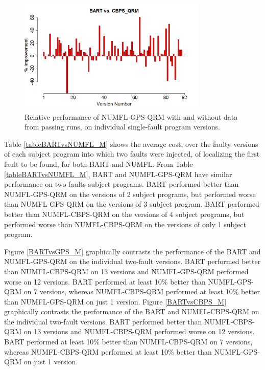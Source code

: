 \begin{figure}[!thpb]
\centering
\includegraphics[width=0.8\textwidth]{chapter4_BARTvsCBPS.pdf}
\caption{Relative performance of NUMFL-GPS-QRM with and without data from passing runs, on individual single-fault program versions.}
\label{BARTvsCBPS}
\end{figure}

Table \ref{tableBARTvsNUMFL_M} shows the average cost, over the faulty versions of each subject program into which two faults were injected, of localizing the first fault to be found, for both BART and NUMFL.  From Table \ref{tableBARTvsNUMFL_M}, BART and NUMFL-GPS-QRM have similar performance on two faults subject programs. BART performed better than NUMFL-GPS-QRM on the versions of  2 subject programs, but performed worse than NUMFL-GPS-QRM on the versions of 3 subject program.  BART performed better than NUMFL-CBPS-QRM on the versions of 4 subject programs, but performed worse than NUMFL-CBPS-QRM on the versions of only 1 subject program.

Figure \ref{BARTvsGPS_M} graphically contrasts the performance of the BART and NUMFL-GPS-QRM on the individual two-fault versions.  BART performed better than NUMFL-CBPS-QRM on 13 versions and NUMFL-GPS-QRM performed worse on 12 versions.  BART performed at least 10\% better than NUMFL-GPS-QRM on 7 versions, whereas NUMFL-CBPS-QRM performed at least 10\% better than NUMFL-GPS-QRM on just 1 version. Figure \ref{BARTvsCBPS_M} graphically contrasts the performance of the BART and NUMFL-CBPS-QRM on the individual two-fault versions.  BART performed better than NUMFL-CBPS-QRM on 13 versions and NUMFL-CBPS-QRM performed worse on 12 versions.  BART performed at least 10\% better than NUMFL-CBPS-QRM on 7 versions, whereas NUMFL-CBPS-QRM performed at least 10\% better than NUMFL-GPS-QRM on just 1 version.

